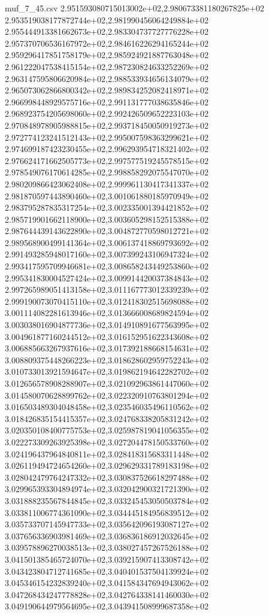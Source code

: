 \begin{filecontents*}{muf_7_45.csv}
2.951593080715013002e+02,2.980673381180267825e+02
2.953519038177872744e+02,2.981990456064249884e+02
2.955444913381662673e+02,2.983304737727776228e+02
2.957370706536167972e+02,2.984616226294165244e+02
2.959296417851758179e+02,2.985924921887763048e+02
2.961222047538415154e+02,2.987230824633252269e+02
2.963147595806620984e+02,2.988533934656134079e+02
2.965073062866800342e+02,2.989834252082418971e+02
2.966998448929575716e+02,2.991131777038635846e+02
2.968923754205698060e+02,2.992426509652223103e+02
2.970848978905988815e+02,2.993718450050919273e+02
2.972774123241512143e+02,2.995007598363299621e+02
2.974699187423230455e+02,2.996293954718321402e+02
2.976624171662505773e+02,2.997577519245578515e+02
2.978549076170614285e+02,2.998858292075547070e+02
2.980209866423062408e+02,2.999961130417341337e+02
2.981870597443890460e+02,3.001061880185970949e+02
2.983795287835317254e+02,3.002335001394421852e+02
2.985719901662118900e+02,3.003605298152515388e+02
2.987644439143622890e+02,3.004872770598012721e+02
2.989568900499141364e+02,3.006137418869793692e+02
2.991493285948017160e+02,3.007399243106947324e+02
2.993417595709946681e+02,3.008658243449253860e+02
2.995341830004527424e+02,3.009914420037384843e+02
2.997265989051413158e+02,3.011167773012339239e+02
2.999190073070415110e+02,3.012418302515698088e+02
3.001114082281613946e+02,3.013666008689824594e+02
3.003038016904877736e+02,3.014910891677563995e+02
3.004961877160244512e+02,3.016152951622343608e+02
3.006885663267937616e+02,3.017392188668154631e+02
3.008809375448266223e+02,3.018628602959752243e+02
3.010733013921594647e+02,3.019862194642282702e+02
3.012656578908288907e+02,3.021092963861447060e+02
3.014580070628899762e+02,3.022320910763801294e+02
3.016503489304048458e+02,3.023546035496110562e+02
3.018426835154415357e+02,3.024768338205831242e+02
3.020350108400775753e+02,3.025987819041056355e+02
3.022273309263925398e+02,3.027204478150533760e+02
3.024196437964840811e+02,3.028418315683311448e+02
3.026119494724654260e+02,3.029629331789183198e+02
3.028042479764247332e+02,3.030837526618297488e+02
3.029965393304894974e+02,3.032042900321721390e+02
3.031888235567844845e+02,3.033245453050503784e+02
3.033811006774361090e+02,3.034445184956839512e+02
3.035733707145947733e+02,3.035642096193087127e+02
3.037656336903981469e+02,3.036836186912032645e+02
3.039578896270038513e+02,3.038027457267526188e+02
3.041501385465724070e+02,3.039215907413308742e+02
3.043423804712741685e+02,3.040401537504139924e+02
3.045346154232839240e+02,3.041584347694943062e+02
3.047268434247778828e+02,3.042764338141460030e+02
3.049190644979564695e+02,3.043941508999687358e+02

\end{filecontents*}
